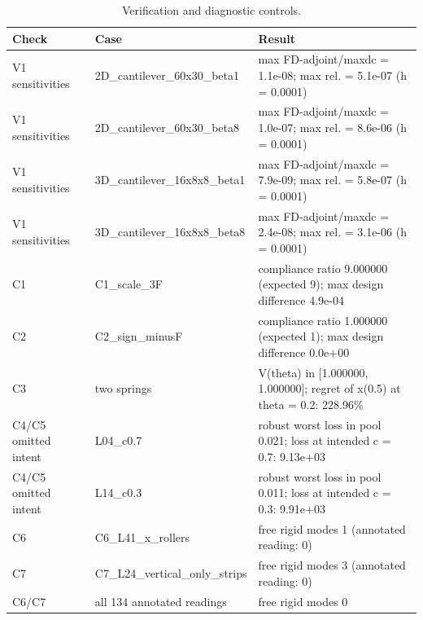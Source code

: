 \begin{table}[t]
\centering\small
\caption{Verification and diagnostic controls.}
\label{tab:tab_verification}
\begin{tabular}{llp{9cm}}
\toprule
Check & Case & Result \\
\midrule
V1 sensitivities & 2D\_cantilever\_60x30\_beta1 & max \textbar{}FD-adjoint\textbar{}/max\textbar{}dc\textbar{} = 1.1e-08; max rel. = 5.1e-07 (h = 0.0001) \\
V1 sensitivities & 2D\_cantilever\_60x30\_beta8 & max \textbar{}FD-adjoint\textbar{}/max\textbar{}dc\textbar{} = 1.0e-07; max rel. = 8.6e-06 (h = 0.0001) \\
V1 sensitivities & 3D\_cantilever\_16x8x8\_beta1 & max \textbar{}FD-adjoint\textbar{}/max\textbar{}dc\textbar{} = 7.9e-09; max rel. = 5.8e-07 (h = 0.0001) \\
V1 sensitivities & 3D\_cantilever\_16x8x8\_beta8 & max \textbar{}FD-adjoint\textbar{}/max\textbar{}dc\textbar{} = 2.4e-08; max rel. = 3.1e-06 (h = 0.0001) \\
C1 & C1\_scale\_3F & compliance ratio 9.000000 (expected 9); max design difference 4.9e-04 \\
C2 & C2\_sign\_minusF & compliance ratio 1.000000 (expected 1); max design difference 0.0e+00 \\
C3 & two springs & V(theta) in [1.000000, 1.000000]; regret of x(0.5) at theta = 0.2: 228.96\% \\
C4/C5 omitted intent & L04\_c0.7 & robust worst loss in pool 0.021; loss at intended c = 0.7: 9.13e+03 \\
C4/C5 omitted intent & L14\_c0.3 & robust worst loss in pool 0.011; loss at intended c = 0.3: 9.91e+03 \\
C6 & C6\_L41\_x\_rollers & free rigid modes 1 (annotated reading: 0) \\
C7 & C7\_L24\_vertical\_only\_strips & free rigid modes 3 (annotated reading: 0) \\
C6/C7 & all 134 annotated readings & free rigid modes 0 \\
\bottomrule
\end{tabular}
\end{table}
